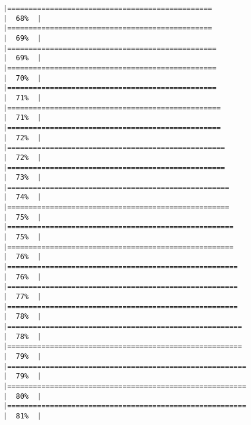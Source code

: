 \documentclass[
]{book}
\begin{document}
\begin{verbatim}
|================================================                      |  68%  |                                                                              |================================================                      |  69%  |                                                                              |=================================================                     |  69%  |                                                                              |=================================================                     |  70%  |                                                                              |=================================================                     |  71%  |                                                                              |==================================================                    |  71%  |                                                                              |==================================================                    |  72%  |                                                                              |===================================================                   |  72%  |                                                                              |===================================================                   |  73%  |                                                                              |====================================================                  |  74%  |                                                                              |====================================================                  |  75%  |                                                                              |=====================================================                 |  75%  |                                                                              |=====================================================                 |  76%  |                                                                              |======================================================                |  76%  |                                                                              |======================================================                |  77%  |                                                                              |======================================================                |  78%  |                                                                              |=======================================================               |  78%  |                                                                              |=======================================================               |  79%  |                                                                              |========================================================              |  79%  |                                                                              |========================================================              |  80%  |                                                                              |========================================================              |  81%  |                                                                              
\end{verbatim}
\end{document}
